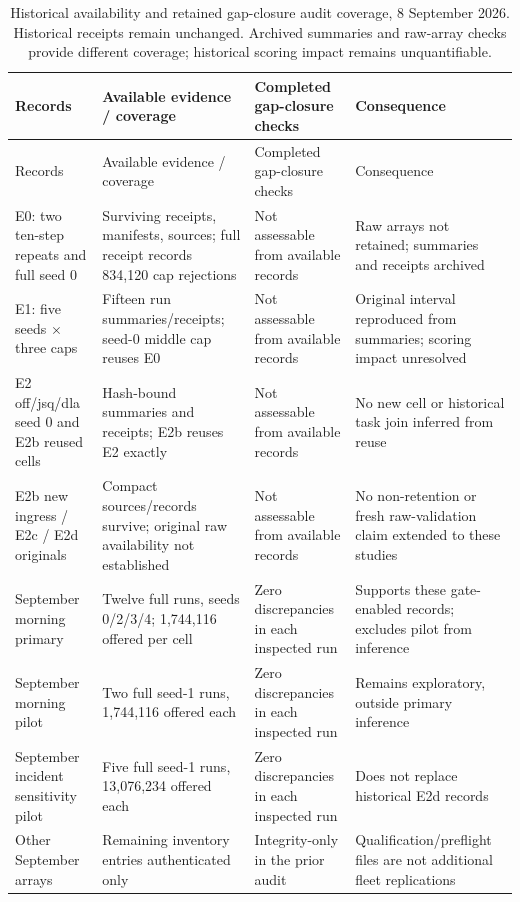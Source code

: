 \documentclass[12pt,a4paper]{article}
\begin{document}
\begingroup
\singlespacing\footnotesize\setlength{\tabcolsep}{3pt}
\begin{xltabular}{\textwidth}{@{}YYYY@{}}
\caption[Historical audit coverage]{Historical availability and retained gap-closure audit coverage, 8 September 2026. Historical receipts remain unchanged. Archived summaries and raw-array checks provide different coverage; historical scoring impact remains unquantifiable.}\label{tab:B1} \\
\toprule
Records & Available evidence / coverage & Completed gap-closure checks & Consequence \\
\midrule\endfirsthead
\toprule
Records & Available evidence / coverage & Completed gap-closure checks & Consequence \\
\midrule\endhead
\bottomrule\endfoot
E0: two ten-step repeats and full seed 0 & Surviving receipts, manifests, sources; full receipt records 834,120 cap rejections & Not assessable from available records & Raw arrays not retained; summaries and receipts archived \\
E1: five seeds \ensuremath{\times} three caps & Fifteen run summaries/receipts; seed-0 middle cap reuses E0 & Not assessable from available records & Original interval reproduced from summaries; scoring impact unresolved \\
E2 off/jsq/dla seed 0 and E2b reused cells & Hash-bound summaries and receipts; E2b reuses E2 exactly & Not assessable from available records & No new cell or historical task join inferred from reuse \\
E2b new ingress / E2c / E2d originals & Compact sources/records survive; original raw availability not established & Not assessable from available records & No non-retention or fresh raw-validation claim extended to these studies \\
September morning primary & Twelve full runs, seeds 0/2/3/4; 1,744,116 offered per cell & Zero discrepancies in each inspected run & Supports these gate-enabled records; excludes pilot from inference \\
September morning pilot & Two full seed-1 runs, 1,744,116 offered each & Zero discrepancies in each inspected run & Remains exploratory, outside primary inference \\
September incident sensitivity pilot & Five full seed-1 runs, 13,076,234 offered each & Zero discrepancies in each inspected run & Does not replace historical E2d records \\
Other September arrays & Remaining inventory entries authenticated only & Integrity-only in the prior audit & Qualification/preflight files are not additional fleet replications \\
\end{xltabular}
\endgroup
\end{document}
